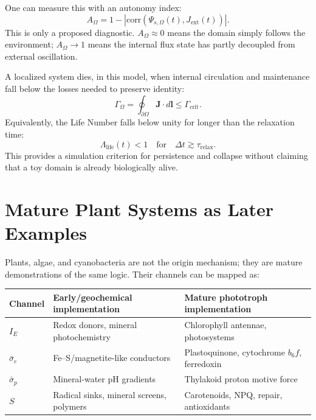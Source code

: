 \documentclass[11pt,a4paper]{article}
\begin{document}
One can measure this with an autonomy index:
\begin{equation}
 A_{\Omega} =
 1 -
 \left|
 \mathrm{corr}\left(\Psi_{s,\Omega}(t),J_{\mathrm{ext}}(t)\right)
 \right|.
\end{equation}
This is only a proposed diagnostic. $A_{\Omega}\approx 0$ means the domain simply follows the environment; $A_{\Omega}\rightarrow 1$ means the internal flux state has partly decoupled from external oscillation.

A localized system dies, in this model, when internal circulation and maintenance fall below the losses needed to preserve identity:
\begin{equation}
 \Gamma_{\Omega} =
 \oint_{\partial\Omega} \bm{J}\cdot d\bm{l}
 \leq
 \Gamma_{\mathrm{crit}}.
\end{equation}
Equivalently, the Life Number falls below unity for longer than the relaxation time:
\begin{equation}
 \Lambda_{\mathrm{life}}(t)<1
 \quad \text{for} \quad
 \Delta t \gtrsim \tau_{\mathrm{relax}}.
\end{equation}
This provides a simulation criterion for persistence and collapse without claiming that a toy domain is already biologically alive.

\section{Mature Plant Systems as Later Examples}

Plants, algae, and cyanobacteria are not the origin mechanism; they are mature demonstrations of the same logic. Their channels can be mapped as:

\begin{center}
\small
\begin{tabular}{p{}p{}p{}}
\toprule
Channel & Early/geochemical implementation & Mature phototroph implementation \\
\midrule
$I_E$ & Redox donors, mineral photochemistry & Chlorophyll antennae, photosystems \\
$\bar{\sigma}_e$ & Fe--S/magnetite-like conductors & Plastoquinone, cytochrome $b_6f$, ferredoxin \\
$\bar{\sigma}_p$ & Mineral-water pH gradients & Thylakoid proton motive force \\
$S$ & Radical sinks, mineral screens, polymers & Carotenoids, NPQ, repair, antioxidants \\
\bottomrule
\end{tabular}
\end{center}
\end{document}
